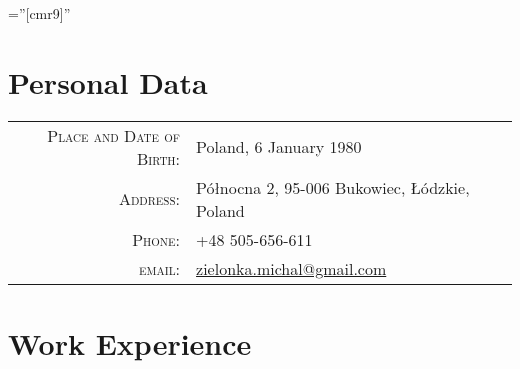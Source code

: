 \documentclass[a4paper,9pt]{article} %
\begin{document}
\pagestyle{empty} %

\font\fb=''[cmr9]'' %


\par{\bigskip\par} %

\section{Personal Data}

\begin{tabular}{rl}
\textsc{Place and Date of Birth:} & Poland, 6 January 1980 \\
\textsc{Address:} & Północna 2, 95-006 Bukowiec, Łódzkie, Poland \\
\textsc{Phone:} & +48 505-656-611 \\
\textsc{email:} & \href{mailto:zielonka.michal@gmail.com}{zielonka.michal@gmail.com}
\end{tabular}


\section{Work Experience}
\end{document}
